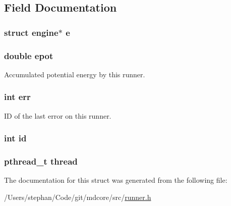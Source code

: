 \subsection{Field Documentation}
\hypertarget{structrunner_a9bbd1f231e51d1c76b353c3eec2169e1}{
\subsubsection[{e}]{\setlength{\rightskip}{0pt plus 5cm}struct {\bf engine}$\ast$ e}}\label{structrunner_a9bbd1f231e51d1c76b353c3eec2169e1}
\hypertarget{structrunner_a3e050eccabbd5322482d7f63e45f038d}{
\subsubsection[{epot}]{\setlength{\rightskip}{0pt plus 5cm}double epot}}\label{structrunner_a3e050eccabbd5322482d7f63e45f038d}
Accumulated potential energy by this runner. \hypertarget{structrunner_a6ce68847c12434f60d1b2654a3dc3409}{
\subsubsection[{err}]{\setlength{\rightskip}{0pt plus 5cm}int err}}\label{structrunner_a6ce68847c12434f60d1b2654a3dc3409}
I\-D of the last error on this runner. \hypertarget{structrunner_a7441ef0865bcb3db9b8064dd7375c1ea}{
\subsubsection[{id}]{\setlength{\rightskip}{0pt plus 5cm}int id}}\label{structrunner_a7441ef0865bcb3db9b8064dd7375c1ea}
\hypertarget{structrunner_a01f75a9ad916f63a94e06a27635ba278}{
\subsubsection[{thread}]{\setlength{\rightskip}{0pt plus 5cm}pthread\-\_\-t thread}}\label{structrunner_a01f75a9ad916f63a94e06a27635ba278}


The documentation for this struct was generated from the following file\-:\begin{DoxyCompactItemize}
\item 
/\-Users/stephan/\-Code/git/mdcore/src/\hyperlink{runner_8h}{runner.\-h}\end{DoxyCompactItemize}
